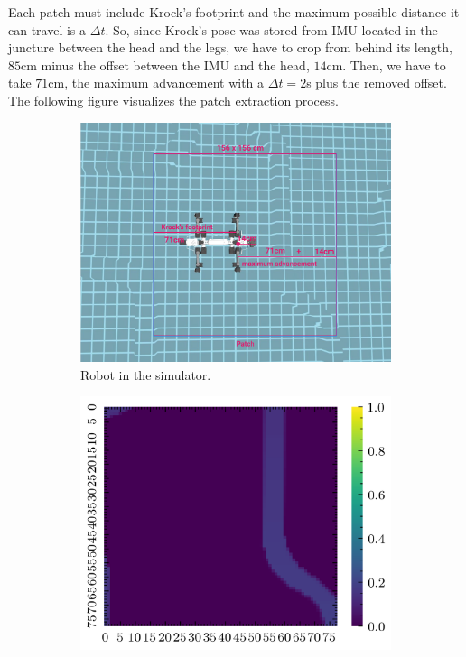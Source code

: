\documentclass[../document.tex]{subfiles}
\begin{document}
Each patch must include Krock's footprint and the maximum possible distance it can travel is a $\Delta t$. So, since Krock's pose was stored from IMU located in the juncture between the head and the legs, we have to crop from behind its length, $85$cm minus the offset between the IMU and the head, $14$cm. Then, we have to take $71$cm, the maximum advancement with a $\Delta t = 2$s plus the removed offset. The following figure visualizes the patch extraction process. 
\begin{figure}[htbp]
    \centering
    \begin{subfigure}[b]{0.66\textwidth}
        \includegraphics[width=\textwidth]{../img/3/crop/crop.png}
        \caption{Robot in the simulator.}
    \end{subfigure}
    \begin{subfigure}[b]{0.45\textwidth}
        \includegraphics[width=\textwidth]{../img/3/crop/test-1-2d.png}

\end{subfigure}
\end{figure}
\end{document}

